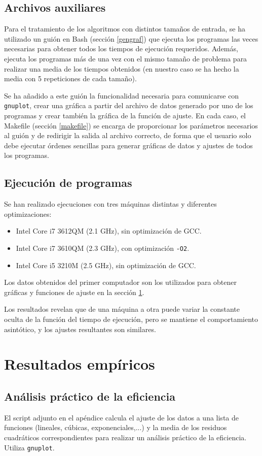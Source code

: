 \documentclass[a4paper, 11pt]{article} %
\begin{document}
\subsection{Archivos auxiliares}

Para el tratamiento de los algoritmos con distintos tamaños de entrada, se ha utilizado un guión en Bash (sección \ref{gengraf}) que ejecuta los programas las veces
necesarias para obtener todos los tiempos de ejecución requeridos. Además, ejecuta los programas más de una vez con el mismo tamaño de
problema para realizar una media de los tiempos obtenidos (en nuestro caso se ha hecho la media con 5 repeticiones de cada tamaño).

Se ha añadido a este guión la funcionalidad necesaria para comunicarse con \texttt{gnuplot}, crear una gráfica a partir del archivo de datos generado por
uno de los programas y crear también la gráfica de la función de ajuste. En cada caso, el Makefile (sección \ref{makefile}) se encarga de proporcionar los parámetros
necesarios al guión y de redirigir la salida al archivo correcto, de forma que el usuario solo debe ejecutar órdenes sencillas para generar gráficas de datos y ajustes de todos los programas.

\subsection{Ejecución de programas}
Se han realizado ejecuciones con tres máquinas distintas y diferentes optimizaciones:
\begin{itemize}
\item Intel Core i7 3612QM (2.1 GHz), sin optimización de GCC.
\item Intel Core i7 3610QM (2.3 GHz), con optimización \texttt{-O2}.
\item Intel Core i5 3210M (2.5 GHz), sin optimización de GCC.
\end{itemize}
Los datos obtenidos del primer computador son los utilizados para obtener gráficas y funciones de ajuste en la sección \ref{ajustes}.

Los resultados revelan que de una máquina a otra puede variar la constante oculta de la función del tiempo de ejecución, pero se mantiene el comportamiento asintótico, y los ajustes resultantes son similares.

\section {Resultados empíricos}
\label{ajustes}
\subsection{Análisis práctico de la eficiencia}
El script adjunto en el apéndice calcula el ajuste de los datos a una lista de funciones
(lineales, cúbicas, exponenciales,...) y la media de los residuos cuadráticos correspondientes
para realizar un análisis práctico de la eficiencia. Utiliza \texttt{gnuplot}.
\end{document}
